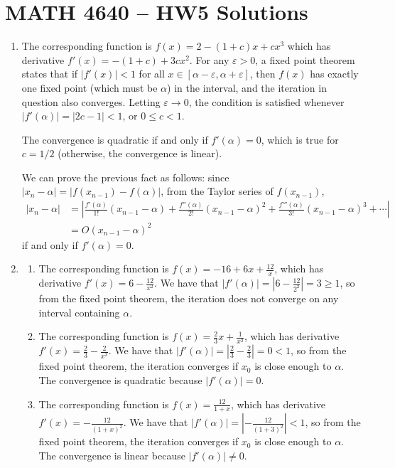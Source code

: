 \documentclass[a4paper,12pt]{article}
\begin{document}
\section*{MATH 4640 -- HW5 Solutions}
\begin{enumerate}
    \item
        The corresponding function is $f(x) = 2 - (1 + c)x + cx^3$ which has derivative $f'(x) = -(1 + c) + 3cx^2$. For any $\varepsilon > 0$, a fixed point theorem states that if $|f'(x)| < 1$ for all $x \in [\alpha - \varepsilon, \alpha + \varepsilon]$, then $f(x)$ has exactly one fixed point (which must be $\alpha$) in the interval, and the iteration in question also converges. Letting $\varepsilon \to 0$, the condition is satisfied whenever $|f'(\alpha)| = |2c - 1| < 1$, or $0 \leq c < 1$. \par
        The convergence is quadratic if and only if $f'(\alpha) = 0$, which is true for $c = 1/2$ (otherwise, the convergence is linear). \par
        We can prove the previous fact as follows: since $|x_n - \alpha| = |f(x_{n - 1}) - f(\alpha)|$, from the Taylor series of $f(x_{n - 1})$,
        \begin{align*}
            |x_n - \alpha| &= \left| \frac{f'(\alpha)}{1!}(x_{n - 1} - \alpha) + \frac{f''(\alpha)}{2!} (x_{n - 1} - \alpha)^2 + \frac{f'''(\alpha)}{3!}(x_{n - 1} - \alpha)^3 + \cdots \right| \\
            &= O(x_{n - 1} - \alpha)^2
        \end{align*}
        if and only if $f'(\alpha) = 0$.

    \item
        \begin{enumerate}
            \item
                The corresponding function is $f(x) = -16 + 6x + \frac{12}{x}$, which has derivative $f'(x) = 6 - \frac{12}{x^2}$. We have that $|f'(\alpha)| = |6 - \frac{12}{2^2}| = 3 \geq 1$, so from the fixed point theorem, the iteration does not converge on any interval containing $\alpha$.
            \item
                The corresponding function is $f(x) = \frac{2}{3}x + \frac{1}{x^2}$, which has derivative $f'(x) = \frac{2}{3} - \frac{2}{x^3}$. We have that $|f'(\alpha)| = |{\frac{2}{3}} - \frac{2}{3}| = 0 < 1$, so from the fixed point theorem, the iteration converges if $x_0$ is close enough to $\alpha$. The convergence is quadratic because $|f'(\alpha)| = 0$.
            \item
                The corresponding function is $f(x) = \frac{12}{1 + x}$, which has derivative $f'(x) = -\frac{12}{(1 + x)^2}$. We have that $|f'(\alpha)| = |{-\frac{12}{(1 + 3)^2}}| < 1$, so from the fixed point theorem, the iteration converges if $x_0$ is close enough to $\alpha$. The convergence is linear because $|f'(\alpha)| \neq 0$.
        \end{enumerate}


\end{enumerate}
\end{document}

